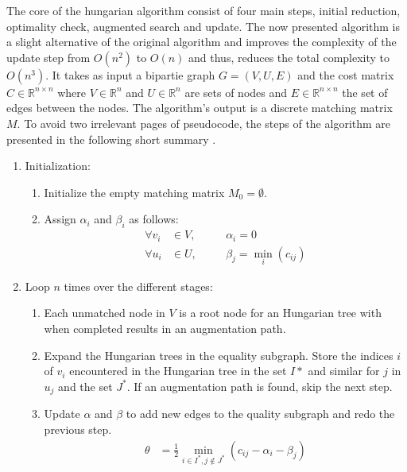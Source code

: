 The core of the hungarian algorithm consist of four main steps, initial reduction, optimality check, augmented search and update. The now presented algorithm is a slight alternative of the original algorithm and improves the complexity of the update step from $O\left(n^{2}\right)$ to $O\left(n\right)$ and thus, reduces the total complexity to $O\left(n^{3}\right)$. It takes as input a bipartie graph $G=(V, U, E)$ and the cost matrix $C \in \mathbb{R}^{n \times n}$ where $V \in \mathbb{R}^n$ and $U \in \mathbb{R}^n$ are sets of nodes and $E \in \mathbb{R}^{n \times n}$ the set of edges between the nodes. The algorithm's output is a discrete matching matrix $M$. To avoid two irrelevant pages of pseudocode, the steps of the algorithm are presented in the following short summary \cite{mills2007dynamic}.

\begin{enumerate}
    \item Initialization: \\
    \begin{enumerate}
        \item Initialize the empty matching matrix $M_{0}=\emptyset$.
        \item Assign $\alpha_i$ and $\beta_i$ as follows:
        \begin{align*}
            \forall v_{i} &\in V, \quad &&\alpha_{i}=0 \\
            \forall u_{i} &\in U, \quad &&\beta_{j}=\min _{i}\left(c_{i j}\right)
        \end{align*}
        \end{enumerate}
    \item Loop $n$ times over the different stages:
    \begin{enumerate}
        \item Each unmatched node in $V$ is a root node for an Hungarian tree with when completed results in an augmentation path.
        \item Expand the Hungarian trees in the equality subgraph. Store the indices $i$ of $v_i$ encountered in the Hungarian tree in the set $I*$ and similar for $j$ in $u_j$ and the set $J^*$. If an augmentation path is found, skip the next step.
        \item Update $\alpha$ and $\beta$ to add new edges to the quality subgraph and redo the previous step.
        \begin{align*}
            \theta&=\frac{1}{2} \min _{i \in I^{*}, j \notin J^{*}}\left(c_{i j}-\alpha_{i}-\beta_{j}\right) \\

\end{align*}
\end{enumerate}
\end{enumerate}
